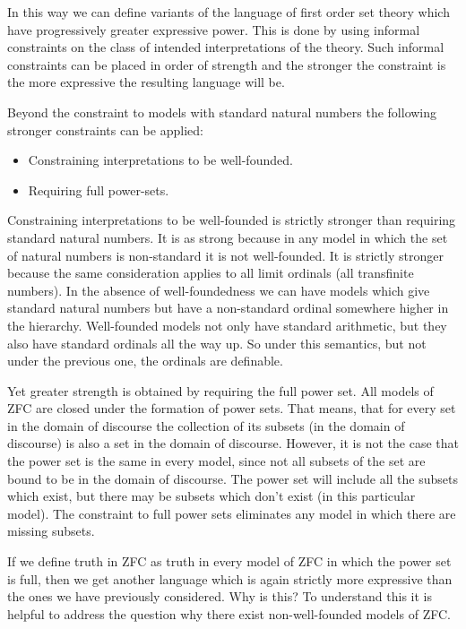 In this way we can define variants of the language of first order set
theory which have progressively greater expressive power.
This is done by using informal constraints on the class of intended
interpretations of the theory.
Such informal constraints can be placed in order of strength and the
stronger the constraint is the more expressive the resulting language
will be.

Beyond the constraint to models with standard natural numbers the
following stronger constraints can be applied:

\begin{itemize}
\item Constraining interpretations to be well-founded. 
\item Requiring full power-sets.
\end{itemize}

Constraining interpretations to be well-founded is strictly stronger
than requiring standard natural numbers.
It is as strong because in any model in which the set of natural numbers is
non-standard it is not well-founded.
It is strictly stronger because the same consideration applies to all
limit ordinals (all transfinite numbers).
In the absence of well-foundedness we can have models which give
standard natural numbers but have a non-standard ordinal somewhere
higher in the hierarchy.
Well-founded models not only have standard arithmetic, but they also
have standard ordinals all the way up.
So under this semantics, but not under the previous one, the ordinals
are definable.

Yet greater strength is obtained by requiring the full power set.
All models of ZFC are closed under the formation of power sets.
That means, that for every set in the domain of discourse the
collection of its subsets (in the domain of discourse) is also a set
in the domain of discourse.
However, it is not the case that the power set is the same in every
model, since not all subsets of the set are bound to be in the domain
of discourse.
The power set will include all the subsets which exist, but there may
be subsets which don't exist (in this particular model).
The constraint to full power sets eliminates any model in which there
are missing subsets.

If we define truth in ZFC as truth in every model of ZFC in which the
power set is full, then we get another language which is again
strictly more expressive than the ones we have previously considered.
Why is this?
To understand this it is helpful to address the question why there
exist non-well-founded models of ZFC.

